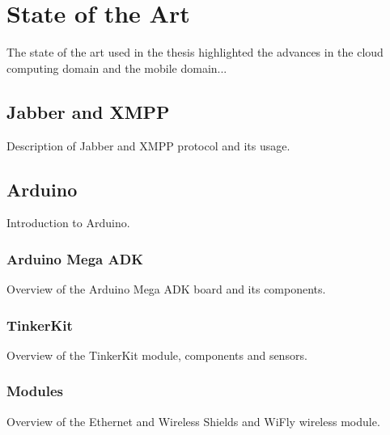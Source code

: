 
\chapter{State of the Art} %


The state of the art used in the thesis highlighted the advances in the cloud computing domain and the mobile domain...


\ifpdf
    \graphicspath{{X/figures/PNG/}{X/figures/PDF/}{X/figures/}}
\else
    \graphicspath{{X/figures/EPS/}{X/figures/}}
\fi


\section{Jabber and XMPP}
Description of Jabber and XMPP protocol and its usage.

\section{Arduino}
Introduction to Arduino.

\subsection{Arduino Mega ADK}
Overview of the Arduino Mega ADK board and its components.

\subsection{TinkerKit}
Overview of the TinkerKit module, components and sensors.

\subsection{Modules}
Overview of the Ethernet and Wireless Shields and WiFly wireless module.

